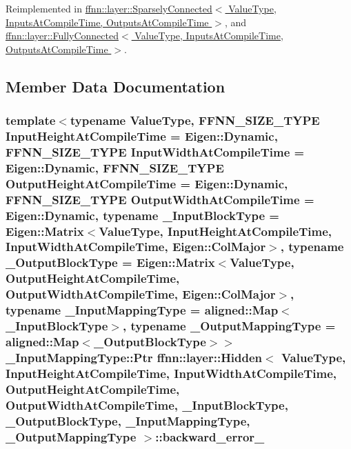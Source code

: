 Reimplemented in \hyperlink{classffnn_1_1layer_1_1_sparsely_connected_afa564d528e74917231da2d038f76e3f1}{ffnn\-::layer\-::\-Sparsely\-Connected$<$ Value\-Type, Inputs\-At\-Compile\-Time, Outputs\-At\-Compile\-Time $>$}, and \hyperlink{classffnn_1_1layer_1_1_fully_connected_a3194dde96feea7d008cc0c27f30cc805}{ffnn\-::layer\-::\-Fully\-Connected$<$ Value\-Type, Inputs\-At\-Compile\-Time, Outputs\-At\-Compile\-Time $>$}.



\subsection{Member Data Documentation}
\hypertarget{classffnn_1_1layer_1_1_hidden_aa9ed4266924e9b9da7faf9d53380a3e5}{
\subsubsection[{backward\-\_\-error\-\_\-}]{\setlength{\rightskip}{0pt plus 5cm}template$<$typename Value\-Type, F\-F\-N\-N\-\_\-\-S\-I\-Z\-E\-\_\-\-T\-Y\-P\-E Input\-Height\-At\-Compile\-Time = Eigen\-::\-Dynamic, F\-F\-N\-N\-\_\-\-S\-I\-Z\-E\-\_\-\-T\-Y\-P\-E Input\-Width\-At\-Compile\-Time = Eigen\-::\-Dynamic, F\-F\-N\-N\-\_\-\-S\-I\-Z\-E\-\_\-\-T\-Y\-P\-E Output\-Height\-At\-Compile\-Time = Eigen\-::\-Dynamic, F\-F\-N\-N\-\_\-\-S\-I\-Z\-E\-\_\-\-T\-Y\-P\-E Output\-Width\-At\-Compile\-Time = Eigen\-::\-Dynamic, typename \-\_\-\-Input\-Block\-Type = Eigen\-::\-Matrix$<$\-Value\-Type, Input\-Height\-At\-Compile\-Time, Input\-Width\-At\-Compile\-Time, Eigen\-::\-Col\-Major$>$, typename \-\_\-\-Output\-Block\-Type = Eigen\-::\-Matrix$<$\-Value\-Type, Output\-Height\-At\-Compile\-Time, Output\-Width\-At\-Compile\-Time, Eigen\-::\-Col\-Major$>$, typename \-\_\-\-Input\-Mapping\-Type = aligned\-::\-Map$<$\-\_\-\-Input\-Block\-Type$>$, typename \-\_\-\-Output\-Mapping\-Type = aligned\-::\-Map$<$\-\_\-\-Output\-Block\-Type$>$$>$ \-\_\-\-Input\-Mapping\-Type\-::\-Ptr {\bf ffnn\-::layer\-::\-Hidden}$<$ Value\-Type, Input\-Height\-At\-Compile\-Time, Input\-Width\-At\-Compile\-Time, Output\-Height\-At\-Compile\-Time, Output\-Width\-At\-Compile\-Time, \-\_\-\-Input\-Block\-Type, \-\_\-\-Output\-Block\-Type, \-\_\-\-Input\-Mapping\-Type, \-\_\-\-Output\-Mapping\-Type $>$\-::backward\-\_\-error\-\_\-\hspace{0.3cm}{\ttfamily [protected]}}}\label{classffnn_1_1layer_1_1_hidden_aa9ed4266924e9b9da7faf9d53380a3e5}


